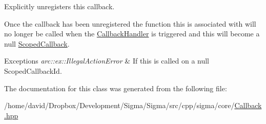 Explicitly unregisters this callback. 

Once the callback has been unregistered the function this is associated with will no longer be called when the \hyperlink{classsigma_1_1core_1_1_callback_handler}{Callback\-Handler} is triggered and this will become a null \hyperlink{classsigma_1_1core_1_1_scoped_callback}{Scoped\-Callback}.


\begin{DoxyExceptions}{Exceptions}
{\em arc\-::ex\-::\-Illegal\-Action\-Error} & If this is called on a null Scoped\-Callback\-Id. \\
\hline
\end{DoxyExceptions}


The documentation for this class was generated from the following file\-:\begin{DoxyCompactItemize}
\item 
/home/david/\-Dropbox/\-Development/\-Sigma/\-Sigma/src/cpp/sigma/core/\hyperlink{_callback_8hpp}{Callback.\-hpp}\end{DoxyCompactItemize}
